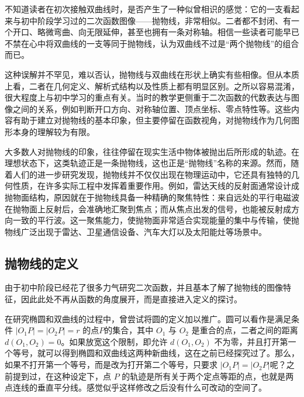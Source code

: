 
\begin{issues}
\issueDraft
\end{issues}


不知道读者在初次接触双曲线时，是否产生了一种似曾相识的感觉：它的一支看起来与初中阶段学习过的二次函数图像——抛物线，非常相似。二者都不封闭、有一个开口、略微弯曲、向无限延伸，甚至也拥有一条对称轴。相信一些读者可能早已不禁在心中将双曲线的一支等同于抛物线，认为双曲线不过是“两个抛物线”的组合而已。

这种误解并不罕见，难以否认，抛物线与双曲线在形状上确实有些相像。但从本质上看，二者在几何定义、解析式结构以及性质上都有明显区别。之所以容易混淆，很大程度上与初中学习的重点有关。当时的教学更侧重于二次函数的代数表达与图像之间的关系，例如判断开口方向、对称轴位置、顶点坐标、零点特性等。这些内容有助于建立对抛物线的基本印象，但主要停留在函数视角，对抛物线作为几何图形本身的理解较为有限。

大多数人对抛物线的印象，往往停留在现实生活中物体被抛出后所形成的轨迹。在理想状态下，这类轨迹正是一条抛物线，这也正是“抛物线”名称的来源。然而，随着人们的进一步研究发现，抛物线并不仅仅出现在物理运动中，它还具有独特的几何性质，在许多实际工程中发挥着重要作用。例如，雷达天线的反射面通常设计成抛物面结构，原因就在于抛物线具备一种精确的聚焦特性：来自远处的平行电磁波在抛物面上反射后，会准确地汇聚到焦点；而从焦点出发的信号，也能被反射成方向一致的平行波。这一聚焦能力，使抛物面非常适合实现能量的集中与传输，使抛物线广泛出现于雷达、卫星通信设备、汽车大灯以及太阳能灶等场景中。

\subsection{抛物线的定义}

由于初中阶段已经花了很多力气研究二次函数，并且基本了解了抛物线的图像特征，因此此处不再从函数的角度展开，而是直接进入定义的探讨。

在研究椭圆和双曲线的过程中，曾尝试将圆的定义加以推广。圆可以看作是满足条件 $|O_1P| = |O_2P| = r$ 的点$P$的集合，其中 $O_1$ 与 $O_2$ 是重合的点，二者之间的距离 $d(O_1,O_2)=0$。如果放宽这个限制，即允许 $d(O_1,O_2)$ 不为零，并且打开第一个等号，就可以得到椭圆和双曲线这两种新曲线，这在之前已经探究过了。那么，如果不打开第一个等号，而是改为打开第二个等号，只要求 $|O_1P| = |O_2P|$呢？之前提到过，在这种设定下，点 $P$ 的轨迹是所有关于两个定点等距的点，也就是两点连线的垂直平分线。感觉似乎这样修改之后没有什么可改动的空间了。

